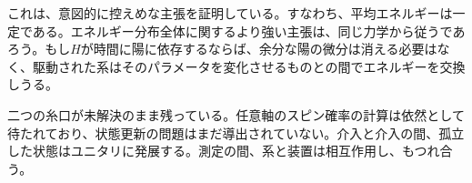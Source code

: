 これは、意図的に控えめな主張を証明している。すなわち、平均エネルギーは一定である。エネルギー分布全体に関するより強い主張は、同じ力学から従うであろう。もし\(H\)が時間に陽に依存するならば、余分な陽の微分は消える必要はなく、駆動された系はそのパラメータを変化させるものとの間でエネルギーを交換しうる。

二つの糸口が未解決のまま残っている。任意軸のスピン確率の計算は依然として待たれており、状態更新の問題はまだ導出されていない。介入と介入の間、孤立した状態はユニタリに発展する。測定の間、系と装置は相互作用し、もつれ合う。

\begin{classroomqa}
\end{classroomqa}

\begin{classroomqa}
\end{classroomqa}
